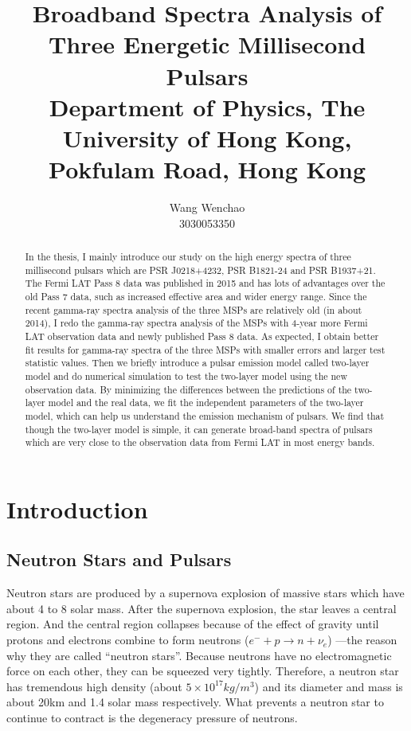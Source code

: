 \documentclass[12pt]{report}
\title{\textbf{Broadband Spectra Analysis of Three Energetic Millisecond Pulsars}\\ \vspace{1cm}
			{\large Department of Physics, The University of Hong Kong, Pokfulam Road, Hong Kong}\\ \vspace{1cm}
}
\date{}
\author{Wang Wenchao  \\3030053350}
\begin{document}
\maketitle
\tableofcontents{}
\begin{abstract}
    \normalsize
    In the thesis, I mainly introduce our study on the high energy spectra of three millisecond pulsars which are  
    PSR J0218+4232, PSR B1821-24 and PSR B1937+21. 
    The Fermi LAT Pass 8 data was published in 2015 and has lots of advantages over the old Pass 7 data, 
    such as increased effective area and wider energy range. Since the recent gamma-ray spectra analysis of 
    the three MSPs are relatively old (in about 2014), I redo the gamma-ray spectra analysis of the MSPs with 
    4-year more Fermi LAT observation data and newly published Pass 8 data. 
    As expected, I obtain better fit results for gamma-ray spectra of 
    the three MSPs with smaller errors and larger test statistic values. Then we briefly introduce 
    a pulsar emission model called two-layer model \cite{0004-637X-787-2-167} and do numerical simulation 
    to test the two-layer model using the new observation data.
    By minimizing the differences between the predictions of the two-layer model and the real 
    data, we fit the independent parameters of the two-layer model, which can help us understand the 
    emission mechanism of pulsars. We find that though the two-layer model is simple, it can generate 
    broad-band spectra of pulsars which are very close to the observation data from Fermi LAT in most energy 
    bands.

\end{abstract}
			
\chapter{Introduction}   	   
    \section{Neutron Stars and Pulsars}
        Neutron stars are produced by a supernova explosion of massive stars which have about 4 to 8 
        solar mass. After 
        the supernova explosion, the star leaves a central region. And the central region collapses because 
        of the effect of 
        gravity until protons and electrons combine to form neutrons ($e^{-}+p\rightarrow n+\nu_{e}$)
        ---the reason why they are called 
        ``neutron stars''.  
        Because neutrons have no electromagnetic force on each other, they can be squeezed very tightly. 
        Therefore, a neutron  
        star has tremendous high density (about $5\times 10^{17} kg/m^3$) and its diameter and mass is about
        20km and 
        1.4 solar mass respectively. What
        prevents a neutron star to continue to contract is the degeneracy pressure of neutrons. 
        
\end{document}
